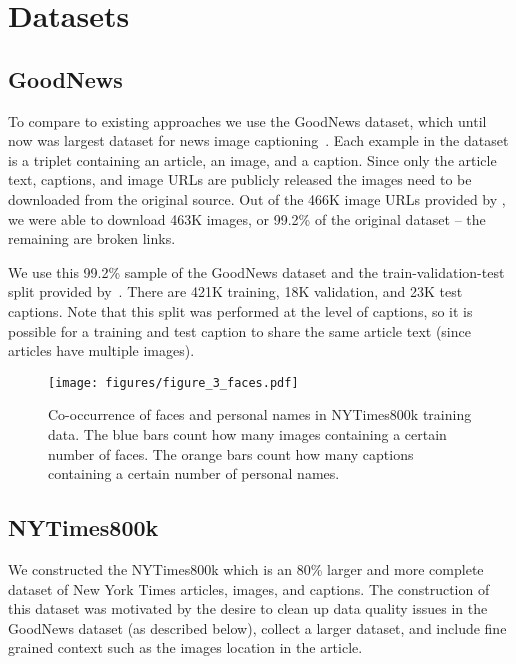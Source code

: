 \section{Datasets}

\subsection{GoodNews}

To compare to existing approaches we use the GoodNews dataset, which until now
was largest
dataset for news image captioning~\cite{Biten2019GoodNews}. Each example in the
dataset is a triplet containing an article, an image, and a caption. Since only
the article text, captions, and image URLs are publicly released
the images need to be downloaded from the original source. Out of the 466K
image
URLs provided by
\cite{Biten2019GoodNews}, we were able to download 463K images, or 99.2\% of the
original dataset -- the remaining are broken links.

We use this 99.2\% sample of the GoodNews dataset and the
train-validation-test split provided by~\cite{Biten2019GoodNews}. There are
421K training, 18K validation, and 23K test captions. Note that
this split was performed at the level of captions, so it is possible for a
training and test
caption to share the same article text (since articles have multiple images).


\begin{figure}[t]
   \begin{center}
   \texttt{[image: figures/figure\_3\_faces.pdf]}
   \end{center}
      \caption{Co-occurrence of faces and personal names in NYTimes800k
               training data. The blue bars count how many images containing a
               certain number of faces. The orange bars count how many captions
               containing a certain number of personal names.}
   \label{fig:faces}
\end{figure}


\subsection{NYTimes800k}
\label{ssec:nytimes800k}

We constructed the NYTimes800k which is an 80\% larger and more complete
dataset
of New York Times articles, images, and captions. The construction of this
dataset was motivated by the desire to clean up data quality issues in the
GoodNews dataset (as described below), collect a larger dataset, and include
fine grained context
such as the images location in the article.

